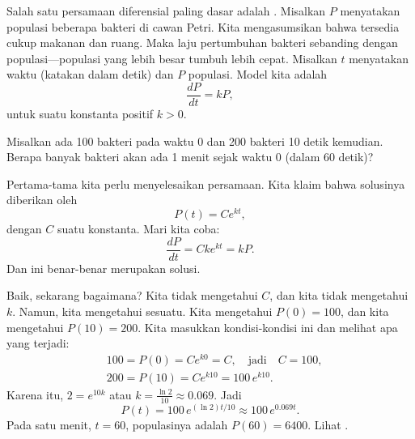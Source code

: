 \begin{example}
Salah satu persamaan diferensial paling dasar
adalah \emph{}.
Misalkan $P$ menyatakan populasi
beberapa bakteri di cawan Petri. Kita mengasumsikan bahwa tersedia cukup makanan
dan ruang. Maka laju pertumbuhan bakteri sebanding
dengan populasi---populasi yang lebih besar tumbuh lebih cepat.
Misalkan $t$ menyatakan waktu (katakan dalam detik) dan $P$ populasi.
Model kita adalah
\begin{equation*}
\frac{dP}{dt} = kP ,
\end{equation*}
untuk suatu konstanta positif $k > 0$.

Misalkan ada 100 bakteri pada waktu 0 dan 200 bakteri 10 detik kemudian.
Berapa banyak bakteri akan ada 1 menit sejak waktu 0 (dalam 60 detik)?

\begin{myfig}
\capstart
{}
\caption{Pertumbuhan bakteri dalam 60 detik pertama.\label{intro:plotbactfig}}
\end{myfig}
%
%
Pertama-tama kita perlu menyelesaikan persamaan. Kita klaim bahwa solusinya diberikan oleh
\begin{equation*}
P(t) = C e^{kt} ,
\end{equation*}
dengan $C$ suatu konstanta. Mari kita coba:
\begin{equation*}
\frac{dP}{dt} = C k e^{kt} = k P .
\end{equation*}
Dan ini benar-benar merupakan solusi.

Baik\@, sekarang bagaimana? Kita tidak mengetahui $C$, dan kita tidak mengetahui $k$.
Namun, kita mengetahui sesuatu. Kita mengetahui $P(0) = 100$, dan kita mengetahui
$P(10) = 200$. Kita masukkan kondisi-kondisi ini dan melihat apa yang terjadi:
\begin{align*}
& 100 = P(0) = C e^{k0} = C, \quad \text{jadi} \quad C=100,\\
& 200 = P(10) = C e^{k10} = 100 \, e^{k10} .
\end{align*}
Karena itu, $2 = e^{10k}$ atau $k = \frac{\ln 2}{10} \approx 0.069$.
Jadi
\begin{equation*}
P(t) = 100 \, e^{(\ln 2) t / 10} \approx 100 \, e^{0.069 t} .
\end{equation*}
Pada satu menit, $t=60$, populasinya adalah $P(60) = 6400$. Lihat
.



\end{example}
